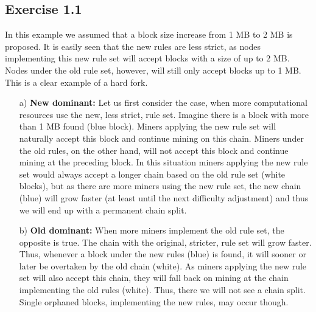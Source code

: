 \documentclass[12pt]{article}
\begin{document}
	\subsection*{Exercise 1.1}
	In this example we assumed that a block size increase from 1 MB to 2 MB is proposed. It is easily seen that the new rules are less strict, as nodes implementing this new rule set will accept blocks with a size of up to 2 MB. Nodes under the old rule set, however, will still only accept blocks up to 1 MB. This is a clear example of a hard fork.
	\begin{itemize}
		\item[a)] \textbf{New dominant:} Let us first consider the case, when more computational resources use the new, less strict, rule set. Imagine there is a block with more than 1 MB found (blue block). Miners applying the new rule set will naturally accept this block and continue mining on this chain. Miners under the old rules, on the other hand, will not accept this block and continue mining at the preceding block. In this situation miners applying the new rule set would always accept a longer chain based on the old rule set (white blocks), but as there are more miners using the new rule set, the new chain (blue) will grow faster (at least until the next difficulty adjustment) and thus we will end up with a permanent chain split.
		\item[b)] \textbf{Old dominant:} When more miners implement the old rule set, the opposite is true. The chain with the original, stricter, rule set will grow faster. Thus, whenever a block under the new rules (blue) is found, it will sooner or later be overtaken by the old chain (white). As miners applying the new rule set will also accept this chain, they will fall back on mining at the chain implementing the old rules (white). Thus, there we will not see a chain split. Single orphaned blocks, implementing the new rules, may occur though.
	\end{itemize}
\end{document}
